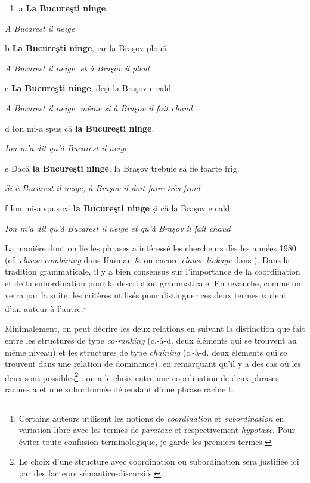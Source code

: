 \begin{enumerate}
\item \label{bkm:Ref268704975}a  \textbf{La Bucureşti ninge}.


\end{enumerate}
{\itshape
A Bucarest il neige}

  b  \textbf{La Bucureşti ninge}, iar la Braşov plouă.

{\itshape
A Bucarest il neige, et à Braşov il pleut} 

  c  \textbf{La Bucureşti ninge}, deşi la Braşov e cald 

{\itshape
A Bucarest il neige, même si à Braşov il fait chaud}

  d  Ion mi-a spus că \textbf{la Bucureşti ninge}.

{\itshape
Ion m'a dit qu'à Bucarest il neige} 

  e  Dacă \textbf{la Bucureşti ninge}, la Braşov trebuie să fie foarte frig.

    \textit{Si à Bucarest il neige, à Braşov il doit faire très froid}

  f  Ion mi-a spus că \textbf{la Bucureşti ninge} şi că la Braşov e cald.

    \textit{Ion m'a dit qu'à Bucarest il neige et qu'à Braşov il fait chaud}

La manière dont on lie les phrases a intéressé les chercheurs dès les années 1980 (cf. \textit{clause combining} dans Haiman \& \citet{Thompson1988} ou encore \textit{clause linkage} dans \citet{Lehmann1988}). Dans la tradition grammaticale, il y a bien consensus sur l'importance de la coordination et de la subordination pour la description grammaticale. En revanche, comme on verra par la suite, les critères utilisés pour distinguer ces deux termes varient d'un auteur à l'autre.\footnote{Certains auteurs utilisent les notions de \textit{coordination} et \textit{subordination} en variation libre avec les termes de \textit{parataxe} et respectivement \textit{hypotaxe}. Pour éviter toute confusion terminologique, je garde les premiers termes.}   

Minimalement, on peut décrire les deux relations en suivant la distinction que \citet{Longacre2007} fait entre les structures de type \textit{co-ranking} (c.-à-d. deux éléments qui se trouvent au même niveau) et les structures de type \textit{chaining} (c.-à-d. deux éléments qui se trouvent dans une relation de dominance), en remarquant qu'il y a des cas où les deux sont possibles\footnote{Le choix d'une structure avec coordination ou subordination sera justifiée ici par des facteurs sémantico-discursifs.} : on a le choix entre une coordination de deux phrases racines a et une subordonnée dépendant d'une phrase racine b.


